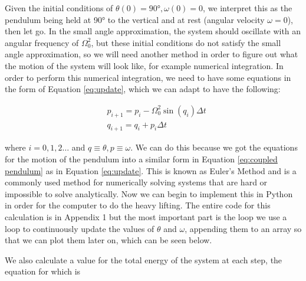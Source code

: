 \documentclass[12pt]{article}
\begin{document}
    \noindent
    Given the initial conditions of $\theta(0)=\ang{90}, \omega(0)=0$, we interpret this as the 
    pendulum being held at \ang{90} to the vertical and at rest (angular velocity $\omega = 0$), 
    then let go. In the small angle approximation, the system should oscillate with an angular 
    frequency of $\Omega_0^2$, but these initial conditions do not satisfy the small angle 
    approximation, so we will need another method in order to figure out what the motion of the 
    system will look like, for example numerical integration. 
    \newline
    \newline
    In order to perform this numerical integration, we need to have some equations in the form 
    of Equation \ref{eq:update}, which we can adapt to have the following:

    \begin{equation}
        \begin{split}
            &p_{i+1} = p_i - \Omega_0^2 \sin(q_i) \Delta t \\
            &q_{i+1} = q_i + p_i \Delta t
        \end{split}
        \label{eq:pendulum update}
    \end{equation}

    \noindent
    where $i=0,1,2\dots$ and $q \equiv \theta, p \equiv \omega$.
    \newline
    We can do this because we got the equations for the motion of the pendulum into a similar 
    form in Equation \ref{eq:coupled pendulum} as in Equation \ref{eq:update}. This is known 
    as Euler's Method and is a commonly used method for numerically solving systems that are 
    hard or impossible to solve analytically. Now we can begin to implement this in Python in 
    order for the computer to do the heavy lifting. 
    \newline
    \newline
    The entire code for this calculation is in Appendix 1 but the most important part is the 
    loop we use a loop to continuously update the values of $\theta$ and $\omega$, appending 
    them to an array so that we can plot them later on, which can be seen below.
    \newline
        
    
    
    \noindent
    We also calculate a value for the total energy of the system at each step, the equation 
    for which is 
\end{document}
